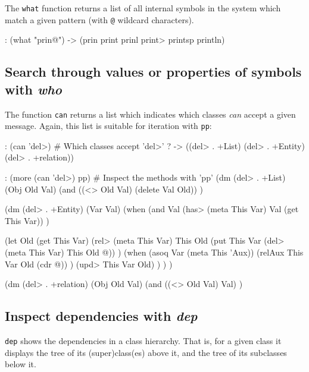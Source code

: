 The \texttt{what} function returns a list of all internal symbols in the system
which match a given pattern (with  \texttt{@}  wildcard characters).


\begin{wideverbatim}
: (what "prin@")
-> (prin print prinl print> printsp println)
\end{wideverbatim}

 
\subsection{Search through values or properties of symbols with \emph{who}}
\label{sec:tut-search-through-values-or-properties-of-symbols-with-can}


The function \texttt{can} returns a list which indicates which classes \emph{can}
accept a given message. Again, this list is suitable for iteration with
\texttt{pp}:


\begin{wideverbatim}
: (can 'del>)                                   # Which classes accept 'del>' ?
-> ((del> . +List) (del> . +Entity) (del> . +relation))

: (more (can 'del>) pp)                         # Inspect the methods with 'pp'
(dm (del> . +List) (Obj Old Val)
   (and ((<> Old Val) (delete Val Old)) )

(dm (del> . +Entity) (Var Val)
   (when
      (and
         Val
         (has> (meta This Var) Val (get This Var)) )

\end{wideverbatim}

\begin{wideverbatim}


      (let Old (get This Var)
         (rel>
            (meta This Var)
            This
            Old
            (put This Var (del> (meta This Var) This Old @)) )
         (when (asoq Var (meta This 'Aux))
            (relAux This Var Old (cdr @)) )
         (upd> This Var Old) ) ) )

(dm (del> . +relation) (Obj Old Val)
   (and ((<> Old Val) Val) )
\end{wideverbatim}

 
\subsection{Inspect dependencies with \emph{dep}}
\label{sec:tut-inspect-dependencies-with-dep}


\texttt{dep} shows the dependencies in a class hierarchy. That is, for a given
class it displays the tree of its (super)class(es) above it, and the
tree of its subclasses below it.

